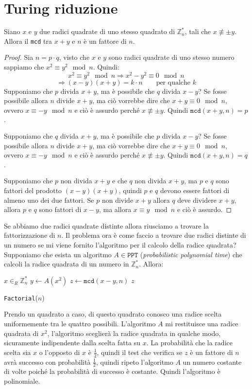 \section{Turing riduzione}
\begin{lemma}
  Siano $x$ e $y$ due radici quadrate di uno stesso quadrato di $\mathbb{Z}_n^*$, tali che 
  $x \not \equiv \pm y$. Allora il \texttt{mcd} tra $x + y$ e $n$ è un fattore di $n$.
\end{lemma}
\begin{proof}
  Sia $n=p\cdot q$, visto che $x$ e $y$ sono radici quadrate di uno stesso numero 
  sappiamo che $x^2 \equiv y^2 \mod n$. Quindi:
  \[
    x^2 \equiv y^2 \mod n \Rightarrow x^2 - y^2 \equiv 0 \mod n 
  \]
  \[
    \Rightarrow (x-y)(x+y) = k \cdot n \qquad \text{per qualche $k$}
  \]
  Supponiamo che $p$ divida $x+y$, ma è possibile che $q$ divida $x-y$?
  Se fosse possibile allora $n$ divide $x +y$, ma ciò vorrebbe dire che $x+y \equiv 0 \mod n$,
  ovvero $x \equiv -y \mod n$ e ciò è assurdo perché $x \not \equiv \pm y$.
  Quindi $\texttt{mcd}(x+y, n) = p$.
  
  Supponiamo che $q$ divida $x+y$, ma è possibile che $p$ divida $x-y$?
  Se fosse possibile allora $n$ divide $x +y$, ma ciò vorrebbe dire che $x+y \equiv 0 \mod n$,
  ovvero $x \equiv -y \mod n$ e ciò è assurdo perché $x \not \equiv \pm y$.
  Quindi $\texttt{mcd}(x+y, n) = q$.

  Supponiamo che $p$ non divida $x+y$ e che $q$ non divida $x+y$, ma $p$ e $q$ sono 
  fattori del prodotto $(x-y)(x+y)$, quindi $p$ e $q$ devono essere fattori di almeno 
  uno dei due fattori. Se $p$ non divide $x+y$ allora $q$ deve dividere $x+y$, allora 
  $p$ e $q$ sono fattori di $x-y$, ma allora $x \equiv y \mod n$ e ciò è assurdo.
   
\end{proof}
Se abbiamo due radici quadrate distinte allora riusciamo a trovare la fattorizzazione di $n$. Il 
problema ora è come faccio a trovare due radici distinte di un numero se mi viene fornito l'algoritmo 
per il calcolo della radice quadrata?
Supponiamo che esista un algoritmo $A\in \texttt{PPT}$ (\textit{probabilistic polynomial time})
che calcoli la radice quadrata di un numero in $\mathbb{Z}_n^*$. Allora:
\begin{algorithmic}[1]
    \State $x \in_R \mathbb{Z}_n^*$
    \State $y \gets A(x^2)$
    \State $z \gets \texttt{mcd}(x-y, n)$
      \Return $z$
    \Else

      \Return \texttt{Factorial}($n$)
    \EndIf
  \EndProcedure
\end{algorithmic}
Prendo un quadrato a caso, di questo quadrato conosco una radice scelta uniformemente 
tra le quattro possibili. L'algoritmo $A$ mi restituisce una radice quadrata di $x^2$,
l'algoritmo sceglierà la radice quadrata in qualche modo, sicuramente indipendente dalla 
scelta fatta su $x$. La probabilità che la radice scelta sia $x$ o l'opposto di $x$ è
$\frac{1}{2}$, quindi il test che verifica se $z$ è un fattore di $n$ avrà successo con
probabilità $\frac{1}{2}$, quindi ripeto l'algoritmo $A$ un numero costante di volte
poiché la probabilità di successo è costante. Quindi l'algoritmo è polinomiale.

